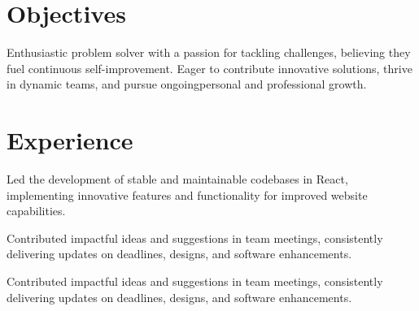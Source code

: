 \documentclass[]{plushcv}
\begin{document}
%
%




%
%

\begin{minipage}[t]{0.70\textwidth} 


\section{Objectives}
{Enthusiastic problem solver with a passion for tackling challenges, believing they fuel continuous self-improvement. Eager to contribute innovative solutions, thrive in dynamic teams, and pursue ongoingpersonal and professional growth.}



\section{Experience}
\vspace{2mm}
\begin{tightemize}
\sectionsep
\item Led the development of stable and maintainable codebases in React, implementing innovative features and functionality for improved website capabilities.
\item Contributed impactful ideas and suggestions in team meetings, consistently delivering updates on deadlines, designs, and software enhancements.
\item Contributed impactful ideas and suggestions in team meetings, consistently delivering updates on deadlines, designs, and software enhancements.
\end{tightemize}
\sectionsep



\end{minipage}
\end{document}
